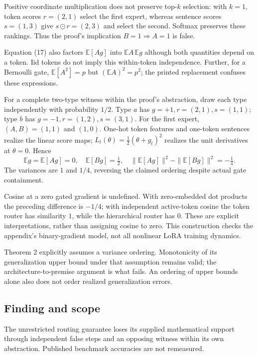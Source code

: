 \documentclass[11pt]{article}
\begin{document}
Positive coordinate multiplication does not preserve top-\(k\) selection: with \(k=1\), token scores \(r=(2,1)\) select the first expert, whereas sentence scores \(s=(1,3)\) give \(s\odot r=(2,3)\) and select the second. Softmax preserves these rankings. Thus the proof’s implication \(B=1\Rightarrow A=1\) is false.

Equation (17) also factors \(\mathbb E[Ag]\) into \(\mathbb EA\,\mathbb Eg\) although both quantities depend on a token. Iid tokens do not imply this within-token independence. Further, for a Bernoulli gate, \(\mathbb E[A^2]=p\) but \((\mathbb EA)^2=p^2\); the printed replacement confuses these expressions.

For a complete two-type witness within the proof’s abstraction, draw each type independently with probability \(1/2\). Type \(a\) has \(g=+1,r=(2,1),s=(1,1)\); type \(b\) has \(g=-1,r=(1,2),s=(3,1)\). For the first expert, \((A,B)=(1,1)\) and \((1,0)\). One-hot token features and one-token sentences realize the linear score maps; \(L_t(\theta)=\tfrac12(\theta+g_t)^2\) realizes the unit derivatives at \(\theta=0\). Hence \[\mathbb Eg=\mathbb E[Ag]=0,\quad\mathbb E[Bg]=\tfrac12,\quad\|\mathbb E[Ag]\|^2-\|\mathbb E[Bg]\|^2=-\tfrac14.\] The variances are \(1\) and \(1/4\), reversing the claimed ordering despite actual gate containment.

Cosine at a zero gated gradient is undefined. With zero-embedded dot products the preceding difference is \(-1/4\); with independent active-token cosine the token router has similarity \(1\), while the hierarchical router has \(0\). These are explicit interpretations, rather than assigning cosine to zero. This construction checks the appendix’s binary-gradient model, not all nonlinear LoRA training dynamics.

Theorem 2 explicitly assumes a variance ordering. Monotonicity of its generalization upper bound under that assumption remains valid; the architecture-to-premise argument is what fails. An ordering of upper bounds alone also does not order realized generalization errors.

\subsection*{Finding and scope}

The unrestricted routing guarantee loses its supplied mathematical support through independent false steps and an opposing witness within its own abstraction. Published benchmark accuracies are not remeasured.
\end{document}
